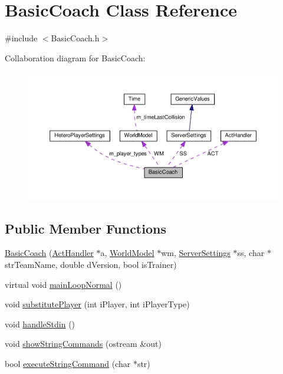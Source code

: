 \hypertarget{classBasicCoach}{}\section{Basic\+Coach Class Reference}
\label{classBasicCoach}


{\ttfamily \#include $<$Basic\+Coach.\+h$>$}



Collaboration diagram for Basic\+Coach\+:
\nopagebreak
\begin{figure}[H]
\begin{center}
\leavevmode
\includegraphics[width=350pt]{classBasicCoach__coll__graph}
\end{center}
\end{figure}
\subsection*{Public Member Functions}
\begin{DoxyCompactItemize}
\item 
\hyperlink{classBasicCoach_ad4034e11057d7502e4c3aa1ce8cb2aef}{Basic\+Coach} (\hyperlink{classActHandler}{Act\+Handler} $\ast$a, \hyperlink{classWorldModel}{World\+Model} $\ast$wm, \hyperlink{classServerSettings}{Server\+Settings} $\ast$ss, char $\ast$str\+Team\+Name, double d\+Version, bool is\+Trainer)
\item 
virtual void \hyperlink{classBasicCoach_a1f95a359aab679208c7fd00b0813fd52}{main\+Loop\+Normal} ()
\item 
void \hyperlink{classBasicCoach_a80c03fa2905d1e4024cfb9f3b6318e03}{substitute\+Player} (int i\+Player, int i\+Player\+Type)
\item 
void \hyperlink{classBasicCoach_a5508f69d366a39987d3c44aacdb25de9}{handle\+Stdin} ()
\item 
void \hyperlink{classBasicCoach_a67db9219b8bf738321c0eec0d738d3c7}{show\+String\+Commands} (ostream \&out)
\item 
bool \hyperlink{classBasicCoach_aaecc3faa1de4f37ca005040b397b9c9c}{execute\+String\+Command} (char $\ast$str)
\end{DoxyCompactItemize}

